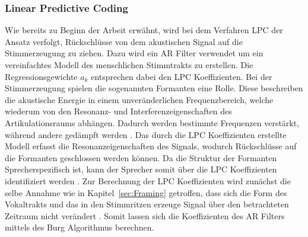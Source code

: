 \subsubsection{Linear Predictive Coding}
Wie bereits zu Beginn der Arbeit erwähnt, wird bei dem Verfahren \ac{LPC} der Ansatz verfolgt, Rückschlüsse von dem akustischen Signal auf die Stimmerzeugung zu ziehen.
Dazu wird ein \ac{AR} Filter verwendet um ein vereinfachtes Modell des menschlichen Stimmtrakts zu erstellen.
Die Regressionsgewichte $a_k$ entsprechen dabei den \ac{LPC} Koeffizienten.
\newline
\newline
Bei der Stimmerzeugung spielen die sogenannten Formanten eine Rolle.
Diese beschreiben die akustische Energie in einem unveränderlichen Frequenzbereich, welche wiederum von den Resonanz- und Interferenzeigenschaften des Artikulationsraums abhängen.
Dadurch werden bestimmte Frequenzen verstärkt, während andere gedämpft werden \autocite[vgl.][S. 259]{fitch_evolution_2000}.
Das durch die \ac{LPC} Koeffizienten erstellte Modell erfasst die Resonanzeigenschaften des Signals, wodurch Rückschlüsse auf die Formanten geschlossen werden können.
Da die Struktur der Formanten Sprecherspezifisch ist, kann der Sprecher somit über die \ac{LPC} Koeffizienten identifiziert werden \autocite[vgl.][S. 117]{sidorov_text-independent_2010}.
\newline
\newline
Zur Berechnung der \ac{LPC} Koeffizienten wird zunächst die selbe Annahme wie in Kapitel~\ref{sec:Framing} getroffen, dass sich die Form des Vokaltrakts und das in den Stimmritzen erzeuge Signal über den betrachteten Zeitraum nicht verändert \autocite[vgl.][S. 1304]{atal_effectiveness_1974}.
Somit lassen sich die Koeffizienten des \ac{AR} Filters mittels des Burg Algorithmus berechnen.